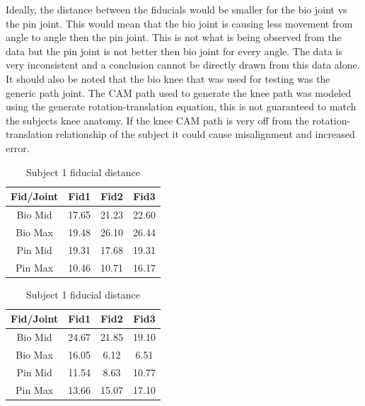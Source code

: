Ideally, the distance between the fiducials would be smaller for the bio joint vs the pin joint. This would mean that the bio joint is causing less movement from angle to angle then the pin joint. This is not what is being observed from the data but the pin joint is not better then bio joint for every angle. The data is very inconsistent and a conclusion cannot be directly drawn from this data alone. It should also be noted that the bio knee that was used for testing was the generic path joint. The CAM path used to generate the knee path was modeled using the generate rotation-translation equation, this is not guaranteed to match the subjects knee anatomy. If the knee CAM path is very off from the rotation-translation relationship of the subject it could cause misalignment and increased error.


\begin{table}
\begin{subtable}[c]{0.5\textwidth}
    \centering
        \begin{tabular}{||c | c c c||} 
         \hline
          Fid/Joint & Fid1 & Fid2 & Fid3  \\ [0.5ex] 
         \hline\hline
         Bio Mid & 17.65 & 21.23 & 22.60 \\ 
         \hline
         Bio Max & 19.48 & 26.10 & 26.44 \\
         \hline
         Pin Mid & 19.31 & 17.68 & 19.31 \\
         \hline
         Pin Max & 10.46 & 10.71 & 16.17 \\ [1ex] 
         \hline
        \end{tabular}
    \end{subtable}
   \begin{subtable}[c]{0.5\textwidth}
   \centering
    \begin{tabular}{||c | c c c||} 
         \hline
          Fid/Joint & Fid1 & Fid2 & Fid3  \\ [0.5ex] 
         \hline\hline
         Bio Mid & 24.67 & 21.85 & 19.10 \\ 
         \hline
         Bio Max & 16.05 & 6.12 & 6.51 \\
         \hline
         Pin Mid & 11.54 & 8.63 & 10.77 \\
         \hline
         Pin Max & 13.66 & 15.07 & 17.10 \\ [1ex]  
         \hline
        \end{tabular}
    \end{subtable}
\caption{Subject 1 fiducial distance}
\label{tab:sub2MRI}
\end{table}




